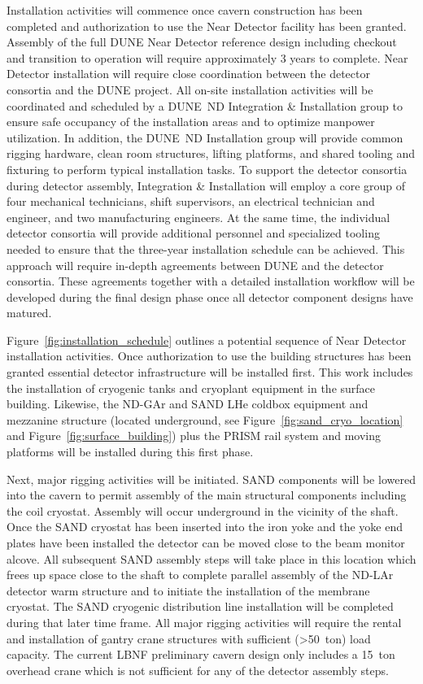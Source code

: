 Installation activities will commence once cavern construction has been completed and authorization to use the Near Detector facility has been granted. Assembly of the full DUNE Near Detector reference design including checkout and transition to operation will require approximately 3 years to complete. Near Detector installation will require close coordination between the detector consortia and the DUNE project. All on-site installation activities will be coordinated and scheduled by a DUNE~ND Integration \& Installation group to ensure safe occupancy of the installation areas and to optimize manpower utilization. In addition, the DUNE~ND Installation group will provide common rigging hardware, clean room structures, lifting platforms, and shared tooling and fixturing to perform typical installation tasks. To support the detector consortia during detector assembly,   Integration \& Installation will employ a core group of four mechanical technicians, shift supervisors, an electrical technician and engineer, and two manufacturing engineers. At the same time, the individual detector consortia will provide additional personnel and specialized tooling needed to ensure that the three-year installation schedule can be achieved. This approach will require in-depth agreements between DUNE and the detector consortia. These agreements together with a detailed installation workflow will be developed during the final design phase once all detector component designs have matured.

Figure~\ref{fig:installation_schedule} outlines a potential sequence of Near Detector installation activities. Once authorization to use the building structures has been granted essential detector infrastructure will be installed first. This work includes the installation of cryogenic tanks and cryoplant equipment in the surface building. Likewise, the ND-GAr and SAND LHe coldbox equipment and mezzanine structure (located underground, see Figure~\ref{fig:sand_cryo_location} and Figure~\ref{fig:surface_building}) plus the PRISM rail system and moving platforms will be installed during this first phase.

Next, major rigging activities will be initiated. SAND components will be lowered into the cavern to permit assembly of the main structural components including the coil cryostat. Assembly will occur underground in the vicinity of the shaft. Once the SAND cryostat has been inserted into the iron yoke and the yoke end plates have been installed the detector can be moved close to the beam monitor alcove. All subsequent SAND assembly steps will take place in this location which frees up space close to the shaft to complete parallel assembly of the ND-LAr detector warm structure and to initiate the installation of the membrane cryostat. The SAND cryogenic distribution line installation will be completed during that later time frame. All major rigging activities will require the rental and installation of gantry crane structures with sufficient (>50~ton) load capacity. The current LBNF preliminary cavern design only includes a 15~ton overhead crane which is not sufficient for any of the detector assembly steps.

